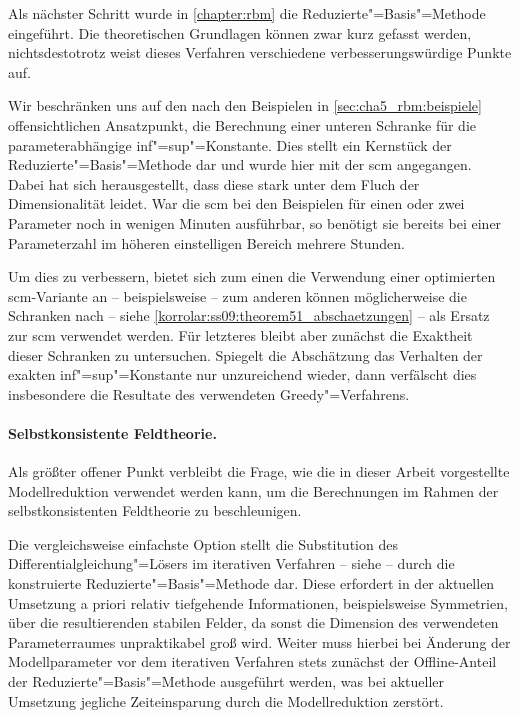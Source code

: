 \documentclass[../main.tex]{subfiles}
\begin{document}
Als nächster Schritt wurde in \cref{chapter:rbm} die Reduzierte"=Basis"=Methode eingeführt.
Die theoretischen Grundlagen können zwar kurz gefasst werden, nichtsdestotrotz weist dieses Verfahren verschiedene verbesserungswürdige Punkte auf.

Wir beschränken uns auf den nach den Beispielen in \cref{sec:cha5_rbm:beispiele} offensichtlichen Ansatzpunkt, die Berechnung einer unteren Schranke für die parameterabhängige inf"=sup"=Konstante.
Dies stellt ein Kernstück der Reduzierte"=Basis"=Methode dar und wurde hier mit der \acl{scm} angegangen.
Dabei hat sich herausgestellt, dass diese stark unter dem Fluch der Dimensionalität leidet.
War die \ac{scm} bei den Beispielen für einen oder zwei Parameter noch in wenigen Minuten ausführbar,
so benötigt sie bereits bei einer Parameterzahl im höheren einstelligen Bereich mehrere Stunden.

Um dies zu verbessern, bietet sich zum einen die Verwendung einer optimierten \ac{scm}-Variante an -- beispielsweise \cite{Huynh2010} -- zum anderen können möglicherweise die Schranken nach \cite{Schwab:2009ec} -- siehe \cref{korrolar:ss09:theorem51_abschaetzungen} -- als Ersatz zur \ac{scm} verwendet werden.
Für letzteres bleibt aber zunächst die Exaktheit dieser Schranken zu untersuchen.
Spiegelt die Abschätzung das Verhalten der exakten inf"=sup"=Konstante nur unzureichend wieder, dann verfälscht dies insbesondere die Resultate des verwendeten Greedy"=Verfahrens.


\paragraph{Selbstkonsistente Feldtheorie.} %
\label{par:selbstkonsistente_feldtheorie}

Als größter offener Punkt verbleibt die Frage, wie die in dieser Arbeit vorgestellte Modellreduktion verwendet werden kann, um die Berechnungen im Rahmen der selbstkonsistenten Feldtheorie zu beschleunigen.

Die vergleichsweise einfachste Option stellt die Substitution des Differentialgleichung"=Lösers im iterativen Verfahren  -- siehe  -- durch die konstruierte Reduzierte"=Basis"=Methode dar.
Diese erfordert in der aktuellen Umsetzung a priori relativ tiefgehende Informationen, beispielsweise Symmetrien, über die resultierenden stabilen Felder, da sonst die Dimension des verwendeten Parameterraumes unpraktikabel groß wird.
Weiter muss hierbei bei Änderung der Modellparameter vor dem iterativen Verfahren stets zunächst der Offline-Anteil der Reduzierte"=Basis"=Methode ausgeführt werden, was bei aktueller Umsetzung jegliche Zeiteinsparung durch die Modellreduktion zerstört.
\end{document}
